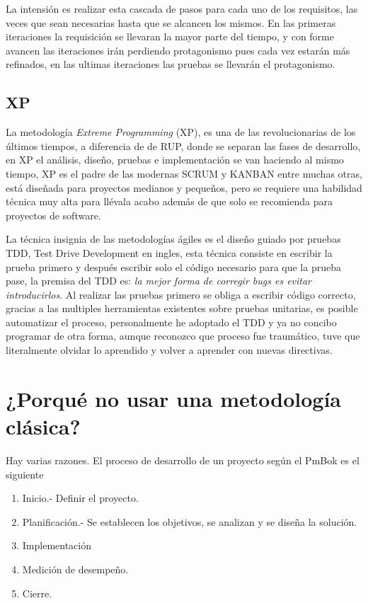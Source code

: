 La intensión es realizar esta cascada de pasos para cada uno de los requisitos,
las veces que sean necesarias hasta que se alcancen los mismos.
En las primeras iteraciones la requisición se llevaran la mayor parte del tiempo,
y con forme avancen las iteraciones irán perdiendo protagonismo pues cada vez 
estarán más refinados, en las ultimas iteraciones las pruebas se llevarán el
protagonismo.

\subsection{XP}
La metodología \emph{Extreme Programming} (XP), es una de las revolucionarias
de los últimos
tiempos, a diferencia de de RUP, donde se separan las fases de desarrollo, en 
XP el análisis, diseño, pruebas e implementación se van haciendo al mismo tiempo,
XP es el padre de las modernas SCRUM y KANBAN entre muchas otras, está diseñada
para proyectos medianos y pequeños, pero se requiere una habilidad técnica muy alta
para llévala acabo además de que solo se recomienda para proyectos de software.

La técnica insignia de las metodologías ágiles es el diseño guiado por pruebas
TDD\cite{tdd}, Test Drive Development en ingles, esta técnica consiste en 
escribir la prueba primero y después 
escribir solo el código necesario para que la prueba pase, la premisa del TDD
es: \emph{la mejor forma de corregir bugs es evitar introducirlos}.
Al realizar las pruebas primero se obliga a escribir código correcto, gracias a 
las multiples herramientas existentes sobre pruebas unitarias, es posible 
automatizar el proceso, personalmente he adoptado el TDD y ya no
concibo programar de otra forma, aunque reconozco que proceso fue traumático,
tuve que literalmente olvidar lo aprendido y volver a aprender con nuevas
directivas.

\section{¿Porqué no usar una metodología clásica?}
Hay varias razones. El proceso de desarrollo de un proyecto según el PmBok es
el siguiente
\begin{enumerate}
	\item Inicio.- Definir el proyecto.
	\item Planificación.- Se establecen los objetivos, se analizan y se
		diseña la solución.
	\item Implementación
	\item Medición de desempeño.
	\item Cierre.
\end{enumerate}

